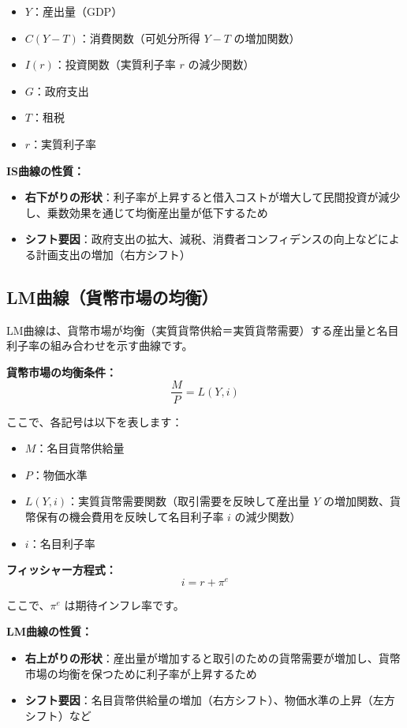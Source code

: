 \documentclass[
  japanese,
  lualatex,
  ja=standard,
  12pt,
  a4paper]{ltjsarticle}
\providecommand{\tightlist}{%
  \setlength{\itemsep}{0pt}\setlength{\parskip}{0pt}}
\begin{document}
\begin{itemize}
\tightlist
\item
  \(Y\)：産出量（GDP）
\item
  \(C(Y - T)\)：消費関数（可処分所得 \(Y-T\) の増加関数）
\item
  \(I(r)\)：投資関数（実質利子率 \(r\) の減少関数）
\item
  \(G\)：政府支出
\item
  \(T\)：租税
\item
  \(r\)：実質利子率
\end{itemize}

\textbf{IS曲線の性質：}

\begin{itemize}
\tightlist
\item
  \textbf{右下がりの形状}：利子率が上昇すると借入コストが増大して民間投資が減少し、乗数効果を通じて均衡産出量が低下するため
\item
  \textbf{シフト要因}：政府支出の拡大、減税、消費者コンフィデンスの向上などによる計画支出の増加（右方シフト）
\end{itemize}

\subsection{LM曲線（貨幣市場の均衡）}\label{lmux66f2ux7ddaux8ca8ux5e63ux5e02ux5834ux306eux5747ux8861}

LM曲線は、貨幣市場が均衡（実質貨幣供給＝実質貨幣需要）する産出量と名目利子率の組み合わせを示す曲線です。

\textbf{貨幣市場の均衡条件：} \[
\frac{M}{P} = L(Y, i)
\]

ここで、各記号は以下を表します：

\begin{itemize}
\tightlist
\item
  \(M\)：名目貨幣供給量
\item
  \(P\)：物価水準
\item
  \(L(Y, i)\)：実質貨幣需要関数（取引需要を反映して産出量 \(Y\)
  の増加関数、貨幣保有の機会費用を反映して名目利子率 \(i\) の減少関数）
\item
  \(i\)：名目利子率
\end{itemize}

\textbf{フィッシャー方程式：} \[
i = r + \pi^e
\]

ここで、\(\pi^e\) は期待インフレ率です。

\textbf{LM曲線の性質：}

\begin{itemize}
\tightlist
\item
  \textbf{右上がりの形状}：産出量が増加すると取引のための貨幣需要が増加し、貨幣市場の均衡を保つために利子率が上昇するため
\item
  \textbf{シフト要因}：名目貨幣供給量の増加（右方シフト）、物価水準の上昇（左方シフト）など
\end{itemize}
\end{document}
